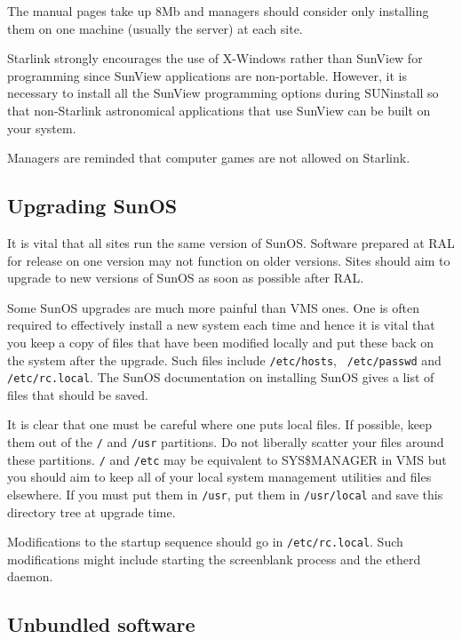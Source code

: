 The manual pages take up 8Mb and managers should consider only installing 
them on one machine (usually the server) at each site. 

Starlink strongly encourages the use of X-Windows rather than SunView for programming
since SunView applications are non-portable. However, it is necessary to 
install all the SunView programming options during SUNinstall so that 
non-Starlink astronomical applications that use SunView can be built on your
system.

Managers are reminded that computer games are not allowed on Starlink.


\subsection {Upgrading SunOS}

It is vital that all sites run the same version of SunOS. Software prepared
at RAL for release on one version may not function on older versions.
Sites should aim to upgrade to new versions of SunOS as soon as
possible after RAL.

Some SunOS upgrades are much more painful than VMS ones. One is often required
to  effectively install a new system each time and hence it is vital that  you
keep a copy of files that have been modified locally and put these back on the
system after the upgrade. Such files include {\tt /etc/hosts}, {\tt
/etc/passwd} and {\tt /etc/rc.local}. The SunOS documentation on installing 
SunOS gives a list of files that should be saved. 

It is clear that one must be careful where one puts local files. If
possible, keep them out of the {\tt /} and {\tt /usr} partitions. Do not liberally scatter
your files around these partitions. {\tt /} and {\tt /etc} may be equivalent to
SYS\$MANAGER in VMS but you should aim to keep all of your local system
management utilities and files elsewhere. If you must put them in {\tt /usr}, put
them in {\tt /usr/local} and save this directory tree at upgrade time. 

Modifications to the startup sequence should go in {\tt /etc/rc.local}. Such 
modifications might include starting the screenblank process and the etherd 
daemon.


\subsection{Unbundled software}

